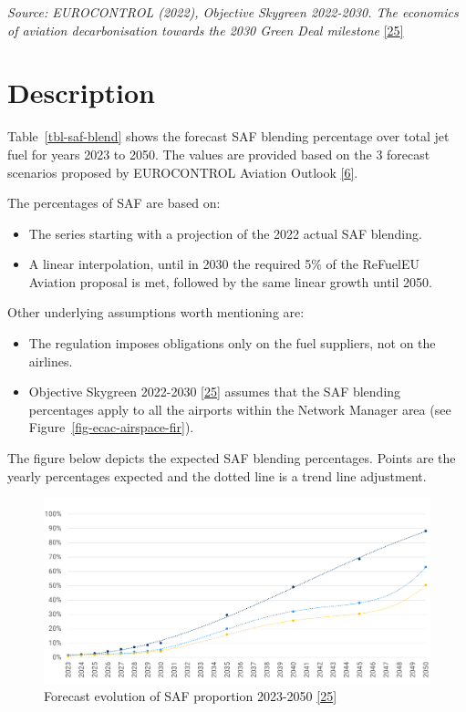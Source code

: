 \documentclass[
  11pt,
  a4paper,
]{book}
\providecommand{\tightlist}{%
  \setlength{\itemsep}{0pt}\setlength{\parskip}{0pt}}\usepackage{longtable,booktabs,array}
\begin{document}
\emph{Source: EUROCONTROL (2022), Objective Skygreen 2022-2030. The
economics of aviation decarbonisation towards the 2030 Green Deal
milestone} \protect\hyperlink{ref-skygreen2022}{{[}25{]}}

\hypertarget{description-1}{%
\section{Description}\label{description-1}}

Table~\ref{tbl-saf-blend} shows the forecast SAF blending percentage
over total jet fuel for years 2023 to 2050. The values are provided
based on the 3 forecast scenarios proposed by EUROCONTROL Aviation
Outlook \protect\hyperlink{ref-aviation:outlook2022}{{[}6{]}}.

The percentages of SAF are based on:

\begin{itemize}
\tightlist
\item
  The series starting with a projection of the 2022 actual SAF blending.
\item
  A linear interpolation, until in 2030 the required 5\% of the ReFuelEU
  Aviation proposal is met, followed by the same linear growth until
  2050.
\end{itemize}

Other underlying assumptions worth mentioning are:

\begin{itemize}
\tightlist
\item
  The regulation imposes obligations only on the fuel suppliers, not on
  the airlines.
\item
  Objective Skygreen 2022-2030
  \protect\hyperlink{ref-skygreen2022}{{[}25{]}} assumes that the SAF
  blending percentages apply to all the airports within the Network
  Manager area (see Figure~\ref{fig-ecac-airspace-fir}).
\end{itemize}

The figure below depicts the expected SAF blending percentages. Points
are the yearly percentages expected and the dotted line is a trend line
adjustment.

\begin{figure}

{\centering \includegraphics{./figures/saf_blend.png}

}

\caption{\label{fig-saf-blend}Forecast evolution of SAF proportion
2023-2050 \protect\hyperlink{ref-skygreen2022}{{[}25{]}}}

\end{figure}
\end{document}
